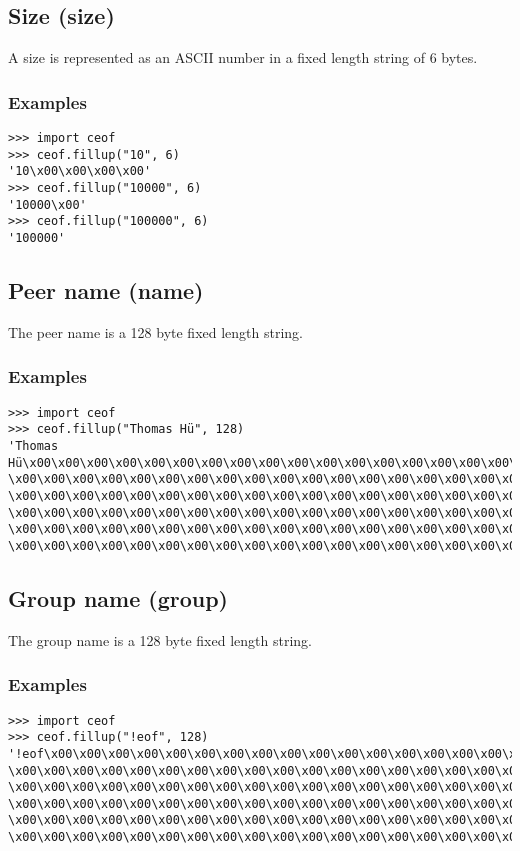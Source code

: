 \subsection{Size (size)}
A size is represented as an ASCII number in a fixed length
string of 6 bytes.
\subsubsection{Examples}
\begin{verbatim}
>>> import ceof
>>> ceof.fillup("10", 6)
'10\x00\x00\x00\x00'
>>> ceof.fillup("10000", 6)
'10000\x00'
>>> ceof.fillup("100000", 6)
'100000'
\end{verbatim}
\subsection{Peer name (name)}
The peer name is a 128 byte fixed length string.
\subsubsection{Examples}
\begin{verbatim}
>>> import ceof
>>> ceof.fillup("Thomas Hü", 128)
'Thomas Hü\x00\x00\x00\x00\x00\x00\x00\x00\x00\x00\x00\x00\x00\x00\x00\x00\x00\x00
\x00\x00\x00\x00\x00\x00\x00\x00\x00\x00\x00\x00\x00\x00\x00\x00\x00\x00\x00\x00
\x00\x00\x00\x00\x00\x00\x00\x00\x00\x00\x00\x00\x00\x00\x00\x00\x00\x00\x00\x00
\x00\x00\x00\x00\x00\x00\x00\x00\x00\x00\x00\x00\x00\x00\x00\x00\x00\x00\x00\x00
\x00\x00\x00\x00\x00\x00\x00\x00\x00\x00\x00\x00\x00\x00\x00\x00\x00\x00\x00\x00
\x00\x00\x00\x00\x00\x00\x00\x00\x00\x00\x00\x00\x00\x00\x00\x00\x00\x00\x00\x00\x00'
\end{verbatim}
\subsection{Group name (group)}
The group name is a 128 byte fixed length string.
\subsubsection{Examples}
\begin{verbatim}
>>> import ceof
>>> ceof.fillup("!eof", 128)
'!eof\x00\x00\x00\x00\x00\x00\x00\x00\x00\x00\x00\x00\x00\x00\x00\x00\x00\x00\x00\x00
\x00\x00\x00\x00\x00\x00\x00\x00\x00\x00\x00\x00\x00\x00\x00\x00\x00\x00\x00\x00\x00
\x00\x00\x00\x00\x00\x00\x00\x00\x00\x00\x00\x00\x00\x00\x00\x00\x00\x00\x00\x00\x00
\x00\x00\x00\x00\x00\x00\x00\x00\x00\x00\x00\x00\x00\x00\x00\x00\x00\x00\x00\x00\x00
\x00\x00\x00\x00\x00\x00\x00\x00\x00\x00\x00\x00\x00\x00\x00\x00\x00\x00\x00\x00\x00
\x00\x00\x00\x00\x00\x00\x00\x00\x00\x00\x00\x00\x00\x00\x00\x00\x00\x00\x00\x00'
\end{verbatim}
